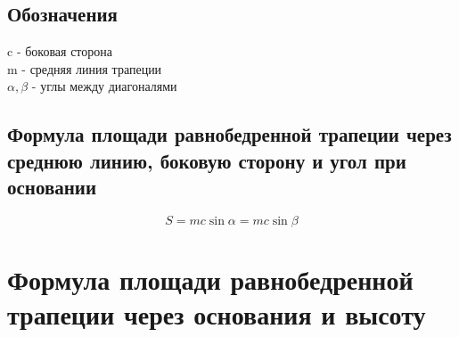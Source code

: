 \documentclass[a4paper,12pt]{article}
\begin{document}
\subsection{Обозначения}

c - боковая сторона \\
m - средняя линия трапеции \\
$\alpha, \beta$ - углы между диагоналями

\subsection{Формула площади равнобедренной трапеции через среднюю линию, боковую сторону и угол при основании}

\[ S = mc\sin\alpha = mc\sin\beta \]

\newpage
\section{Формула площади равнобедренной трапеции через основания и высоту}
\end{document}
